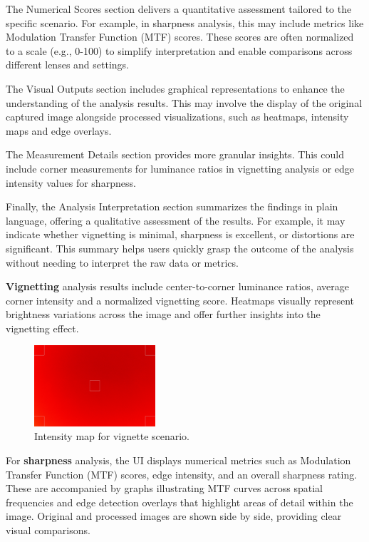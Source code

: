 The Numerical Scores section delivers a quantitative assessment tailored to the specific scenario. For example, in sharpness analysis, this may include metrics like Modulation Transfer Function (MTF) scores. These scores are often normalized to a scale (e.g., 0-100) to simplify interpretation and enable comparisons across different lenses and settings.

The Visual Outputs section includes graphical representations to enhance the understanding of the analysis results. This may involve the display of the original captured image alongside processed visualizations, such as heatmaps, intensity maps and edge overlays.

The Measurement Details section provides more granular insights. This could include corner measurements for luminance ratios in vignetting analysis or edge intensity values for sharpness.

Finally, the Analysis Interpretation section summarizes the findings in plain language, offering a qualitative assessment of the results. For example, it may indicate whether vignetting is minimal, sharpness is excellent, or distortions are significant. This summary helps users quickly grasp the outcome of the analysis without needing to interpret the raw data or metrics.



\textbf{Vignetting} analysis results include center-to-corner luminance ratios, average corner intensity and a normalized vignetting score. Heatmaps visually represent brightness variations across the image and offer further insights into the vignetting effect.

\begin{figure}[hbt]
\centering
\includegraphics[width=0.4\textwidth]{Images/vignette_image_result.png}
\caption{Intensity map for vignette scenario.}
\label{fig:ui_vignette_intensity_map}
\end{figure}

For \textbf{sharpness} analysis, the UI displays numerical metrics such as Modulation Transfer Function (MTF) scores, edge intensity, and an overall sharpness rating. These are accompanied by graphs illustrating MTF curves across spatial frequencies and edge detection overlays that highlight areas of detail within the image. Original and processed images are shown side by side, providing clear visual comparisons.

